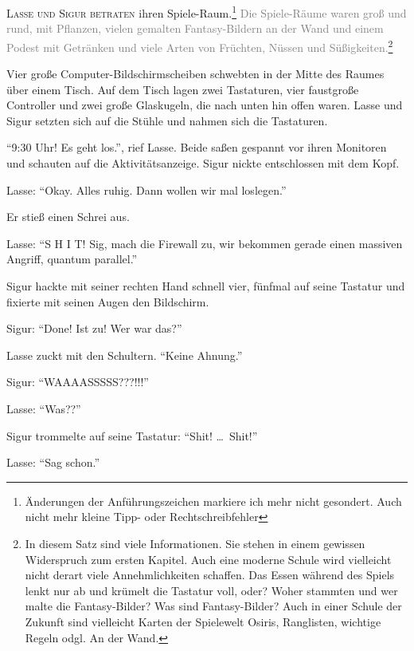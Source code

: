 \label{cha:2064_osiris_attacke}



\textsc{Lasse und Sigur betraten} ihren Spiele-Raum.\footnote{Änderungen der Anführungszeichen markiere ich mehr nicht gesondert. Auch nicht mehr kleine Tipp- oder Rechtschreibfehler}
\textcolor{gray}{Die Spiele-Räume waren groß und rund, mit Pflanzen, vielen gemalten Fantasy-Bildern an der Wand und einem Podest mit Getränken und viele Arten von Früchten, Nüssen und Süßigkeiten.}\footnote{In diesem Satz sind  viele Informationen. Sie stehen in einem gewissen Widerspruch zum ersten Kapitel. Auch eine moderne Schule wird vielleicht nicht derart viele Annehmlichkeiten schaffen. Das Essen während des Spiels lenkt nur ab und krümelt die Tastatur voll, oder? Woher stammten und wer malte die Fantasy-Bilder? Was sind Fantasy-Bilder? Auch in einer Schule der Zukunft sind vielleicht Karten der Spielewelt Osiris, Ranglisten, wichtige Regeln odgl.  An der Wand.}

Vier große Computer-Bildschirmscheiben schwebten in der Mitte des Raumes über einem Tisch.
Auf dem Tisch lagen zwei Tastaturen, vier  faustgroße Controller und zwei große Glaskugeln, die nach unten hin offen waren.
Lasse und Sigur setzten sich auf die Stühle und nahmen sich die Tastaturen.

\enquote{9:30 Uhr! Es geht los.}, rief Lasse.
Beide saßen gespannt vor ihren Monitoren und schauten auf die Aktivitätsanzeige.
Sigur nickte entschlossen mit dem Kopf.

Lasse: \enquote{Okay.
Alles ruhig.
Dann wollen wir mal loslegen.} 

Er stieß einen Schrei aus.

Lasse: \enquote{S H I T! Sig, mach die Firewall zu, wir bekommen gerade einen massiven Angriff, quantum parallel.}

Sigur hackte mit seiner rechten Hand schnell vier, fünfmal auf seine Tastatur und fixierte  mit seinen Augen den Bildschirm.


Sigur: \enquote{Done! Ist zu! Wer war das?} 

Lasse zuckt mit den Schultern.
\enquote{Keine Ahnung.}

Sigur: \enquote{WAAAASSSSS???!!!}

Lasse: \enquote{Was??}

Sigur trommelte auf seine Tastatur: \enquote{Shit! \dots\  Shit!}

Lasse: \enquote{Sag schon.} 

